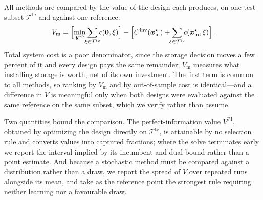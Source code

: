 All methods are compared by the value of the design each produces, on one
test subset $\mathcal{T}^{\mathrm{te}}$ and against one reference:
\begin{equation}
V_{\mathrm{m}}
=
\Bigl[
\min_{\boldsymbol{y}^{\mathrm{op}}}
\!\!\sum_{\xi\in\mathcal{T}^{\mathrm{te}}}\!\!
c(\boldsymbol{0},\xi)
\Bigr]
-
\Bigl[
C^{\mathrm{inv}}(\boldsymbol{x}^{\star}_{\mathrm{m}})
+
\!\!\sum_{\xi\in\mathcal{T}^{\mathrm{te}}}\!\!
c(\boldsymbol{x}^{\star}_{\mathrm{m}},\xi)
\Bigr].
\label{eq:storage_value}
\end{equation}
Total system cost is a poor denominator, since the storage decision moves
a few percent of it and every design pays the same remainder;
$V_{\mathrm{m}}$ measures what installing storage is worth, net of its own
investment. The first term is common to all methods, so ranking by
$V_{\mathrm{m}}$ and by out-of-sample cost is identical---and a difference
in $V$ is meaningful only when both designs were evaluated against the
same reference on the same subset, which we verify rather than assume.

Two quantities bound the comparison. The perfect-information value
$V^{\mathrm{PI}}$, obtained by optimizing the design directly on
$\mathcal{T}^{\mathrm{te}}$, is attainable by no selection rule and
converts values into captured fractions; where the solve terminates early
we report the interval implied by its incumbent and dual bound rather
than a point estimate. And because a stochastic method must be compared
against a distribution rather than a draw, we report the spread of $V$
over repeated runs alongside its mean, and take as the reference point
the strongest rule requiring neither learning nor a favourable draw.

